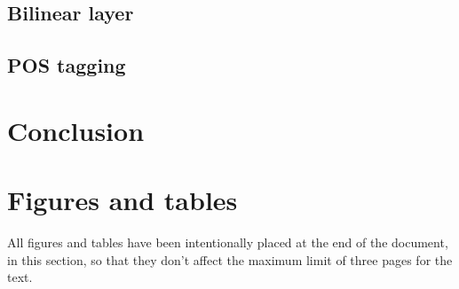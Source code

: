 \documentclass[11pt,a4paper]{article}
\begin{document}
	\subsection{Bilinear layer}
	
	\subsection{POS tagging}
	
	\section{Conclusion}
	
	
	
	
	\clearpage
	\section{Figures and tables}
	All figures and tables have been intentionally placed at the end of the document, in this section, so that they don't affect the maximum limit of three pages for the text.
	
\end{document}
